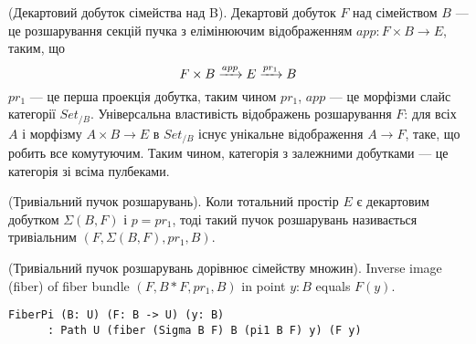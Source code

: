 \begin{definition} (Декартовий добуток сімейства над B).
Декартовй добуток $F$ над сімейством $B$ — це розшарування секцій пучка з елімінюючим відображенням $app : F \times B \rightarrow E$, таким, що
\begin{equation}
F \times B \xrightarrow{{app}} E \xrightarrow{{pr_1}} B
\end{equation}
$pr_1$ — це перша проекція добутка, таким чином $pr_1$, $app$ — це морфізми
слайс категорії $Set_{/B}$. Універсальна властивість відображень розшарування $F$:
для всіх $A$ і морфізму $A \times B \rightarrow E$ в $Set_{/B}$ існує
унікальне відображення $A \rightarrow F$, таке, що робить все комутуючим.
Таким чином, категорія з залежними добутками — це категорія зі всіма пулбеками.
\end{definition}

\begin{definition} (Тривіальний пучок розшарувань).
Коли тотальний простір $E$ є декартовим добутком $\Sigma(B,F)$ і $p = pr_1$,
тоді такий пучок розшарувань називається тривіальним $(F,\Sigma(B,F),pr_1,B)$.
\end{definition}


\begin{theorem} (Тривіальний пучок розшарувань дорівнює сімейству множин).
Inverse image (fiber) of fiber bundle $(F,B*F,pr_1,B)$ in point $y:B$ equals $F(y)$.
\begin{lstlisting}
FiberPi (B: U) (F: B -> U) (y: B)
      : Path U (fiber (Sigma B F) B (pi1 B F) y) (F y)
\end{lstlisting}
\end{theorem}


